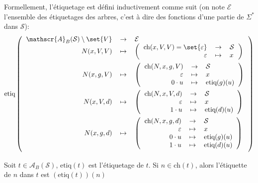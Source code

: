 \documentclass{scrartcl}
\begin{document}
			Formellement, l'étiquetage est défini inductivement comme suit 
			(on note $\mathcal{E}$ l'ensemble des étiquetages des arbres, c'est à dire des fonctions d'une partie de $\Sigma^*$ dans $\mathcal{S}$):
			\[
				\text{etiq}
				\left(\text{\begin{tabular}{r c l}
					$\mathscr{A}_B(\mathcal{S})\setminus\set{V}$ & $\rightarrow$ & $\mathcal{E}$ \\\vspace{5pt}
					$N(x,V,V)$ & $\mapsto$ & 
						$\left(\text{\begin{tabular}{r c l} 
							$\text{ch}(x,V,V) = \set{\varepsilon}$ & $\to$ & $\mathcal{S}$ \\
							$\varepsilon$ & $\mapsto$ & $x$
						\end{tabular}}\right)$ \\\vspace{5pt}
					$N(x,g,V)$ & $\mapsto$ &
						$\left(\text{\begin{tabular}{r c l}
							$\text{ch}(N,x,g,V)$ & $\to$ & $\mathcal{S}$ \\
							$\varepsilon$ & $\mapsto$ & $x$ \\
							$0 \cdot u$ & $\mapsto$ & $\text{etiq}(g) (u)$
						\end{tabular}}\right)$ \\\vspace{5pt}
					$N(x,V,d)$ & $\mapsto$ &
						$\left(\text{\begin{tabular}{r c l}
							$\text{ch}(N,x,V,d)$ & $\to$ & $\mathcal{S}$ \\
							$\varepsilon$ & $\mapsto$ & $x$ \\
							$1 \cdot u$ & $\mapsto$ & $\text{etiq}(d) (u)$
						\end{tabular}}\right)$ \\\vspace{5pt}
					$N(x,g,d)$ & $\mapsto$ &
						$\left(\text{\begin{tabular}{r c l}
							$\text{ch}(N,x,g,d)$ & $\to$ & $\mathcal{S}$ \\
							$\varepsilon$ & $\mapsto$ & $x$ \\
							$0 \cdot u$ & $\mapsto$ & $\text{etiq}(g) (u)$ \\
							$1 \cdot u$ & $\mapsto$ & $\text{etiq}(d) (u)$ 
						\end{tabular}}\right)$
				\end{tabular}}\right)
			\]

			Soit $t \in \mathscr{A}_B(\mathcal{S})$, $\text{etiq}(t)$ est l'étiquetage de $t$.
			Si $n \in \text{ch}(t)$, alors l'étiquette de $n$ dans $t$ est $\left(\text{etiq}(t)\right)(n)$
\end{document}
